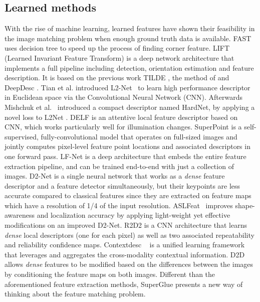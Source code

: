 \subsection{Learned methods}
With the rise of machine learning, learned features have shown their feasibility in the image matching problem when enough ground truth data is available. 
FAST \cite{rosten2006machine} uses decision tree to speed up the process of finding corner feature. 
LIFT (Learned Invariant Feature Transform) \cite{yi2016lift} is a deep network architecture that implements a full pipeline including detection, orientation estimation and feature description. It is based on the previous work TILDE \cite{verdie2015tilde}, the method of \cite{moo2016learning} and DeepDesc \cite{simo2015discriminative}. 
Tian et al. introduced L2-Net~\cite{tian2017l2} to learn high performance descriptor in Euclidean space via the Convolutional Neural Network (CNN). 
Afterwards Mishchuk et al.~\cite{mishchuk2017working} introduced a compact descriptor named HardNet, by applying a novel loss to L2Net \cite{tian2017l2}. 
DELF \cite{noh2017DELF} is an attentive local feature descriptor based on CNN, which works particularly well for illumination changes.
SuperPoint \cite{detone2018superpoint} is a self-supervised, fully-convolutional model that operates on full-sized images and jointly computes pixel-level feature point locations and associated descriptors in one forward pass. 
LF-Net \cite{ono2018lf} is a deep architecture that embeds the entire feature extraction pipeline, and can be trained end-to-end with just a collection of images. 
D2-Net \cite{dusmanu2019d2} is a single neural network that works as a \textit{dense} feature descriptor and a feature detector simultaneously, but their keypoints are less accurate compared to classical features since they are extracted on feature maps which have a resolution of 1/4 of the input resolution.
ASLFeat~\cite{luo2020aslfeat} improves shape-awareness and localization accuracy by applying light-weight yet effective modifications on an improved D2-Net.
R2D2 \cite{revaud2019r2d2} is a CNN architecture that learns \textit{dense} local descriptors (one for each pixel) as well as two associated repeatability and reliability confidence maps.
Contextdesc ~\cite{luo2019contextdesc} is a unified learning framework that leverages and aggregates the cross-modality contextual information.
D2D \cite{wiles2020d2d} allows \textit{dense} features to be modified based on the differences between the images by conditioning the feature maps on both images. 
Different than the aforementioned feature extraction methods, SuperGlue \cite{sarlin2020superglue} presents a new way of thinking about the feature matching problem. 
